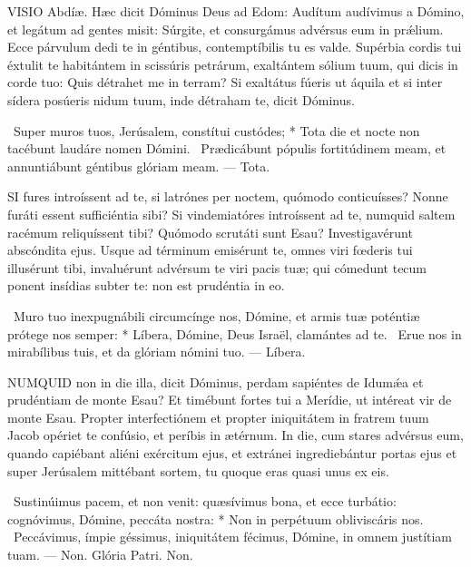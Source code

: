


\lettrine[lines=2]{V}{ISIO} Abdíæ. Hæc dicit Dóminus Deus ad Edom: Audítum audívimus a Dómino, et legátum ad gentes misit: Súrgite, et consurgámus advérsus eum in prǽlium. Ecce párvulum dedi te in géntibus, contemptíbilis tu es valde. Supérbia cordis tui éxtulit te habitántem in scissúris petrárum, exaltántem sólium tuum, qui dicis in corde tuo: Quis détrahet me in terram? Si exaltátus fúeris ut áquila et si inter sídera posúeris nidum tuum, inde détraham te, dicit Dóminus.

\R\ Super muros tuos, Jerúsalem, constítui custódes; * Tota die et nocte non tacébunt laudáre nomen Dómini. \V\ Prædicábunt pópulis fortitúdinem meam, et annuntiábunt géntibus glóriam meam. — Tota.


\lettrine[lines=2]{S}{I} fures introíssent ad te, si latrónes per noctem, quómodo conticuísses? Nonne furáti essent sufficiéntia sibi? Si vindemiatóres introíssent ad te, numquid saltem racémum reliquíssent tibi? Quómodo scrutáti sunt Esau? Investigavérunt abscóndita ejus. Usque ad términum emisérunt te, omnes viri fœderis tui illusérunt tibi, invaluérunt advérsum te viri pacis tuæ; qui cómedunt tecum ponent insídias subter te: non est prudéntia in eo.

\R\ Muro tuo inexpugnábili circumcínge nos, Dómine, et armis tuæ poténtiæ prótege nos semper: * Líbera, Dómine, Deus Israël, clamántes ad te. \V\ Erue nos in mirabílibus tuis, et da glóriam nómini tuo. — Líbera.



\lettrine[lines=2]{N}{UMQUID} non in die illa, dicit Dóminus, perdam sapiéntes de Idumǽa et prudéntiam de monte Esau? Et timébunt fortes tui a Merídie, ut intéreat vir de monte Esau. Propter interfectiónem et propter iniquitátem in fratrem tuum Jacob opériet te confúsio, et períbis in ætérnum. In die, cum stares advérsus eum, quando capiébant aliéni exércitum ejus, et extránei ingrediebántur portas ejus et super Jerúsalem mittébant sortem, tu quoque eras quasi unus ex eis.

\R\ Sustinúimus pacem, et non venit: quæsívimus bona, et ecce turbátio: cognóvimus, Dómine, peccáta nostra: * Non in perpétuum obliviscáris nos. \V\ Peccávimus, ímpie géssimus, iniquitátem fécimus, Dómine, in omnem justítiam tuam. — Non. Glória Patri. Non.


